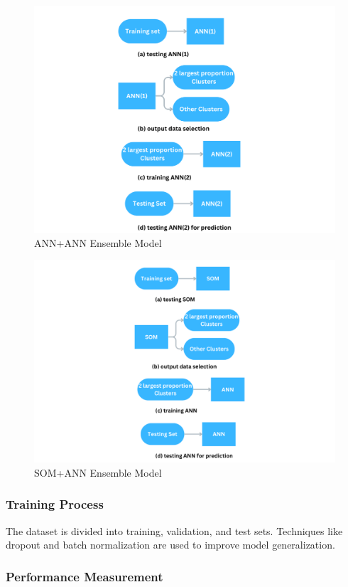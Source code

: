 \begin{figure}[H]
    \centering
    \includegraphics[width=.9\textwidth]{img/ANN+ANN.png}
    \caption{ANN+ANN Ensemble Model}
    \label{fig:ANN+ANN}
\end{figure}
\begin{figure}[H]
    \centering
    \includegraphics[width=.9\textwidth]{img/SOM+ANN.png}
    \caption{SOM+ANN Ensemble Model}
    \label{fig:SOM+ANN}
\end{figure}

\subsubsection{Training Process}

The dataset is divided into training, validation, and test sets.
Techniques like dropout and batch normalization are used to improve model generalization.
\subsubsection{Performance Measurement}

